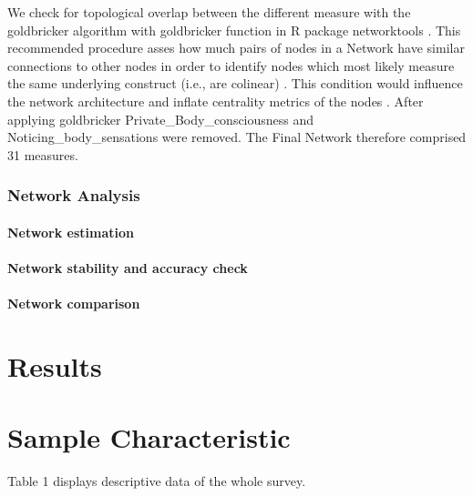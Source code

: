 \documentclass[preprint, 3p,
authoryear]{elsarticle} %
\begin{document}
We check for topological overlap between the different measure with the
goldbricker algorithm with goldbricker function in R package
networktools \citep{jones_networktools_2017}. This recommended procedure
\citep{tomei_network_2022, monteleone_systematic_2021} asses how much
pairs of nodes in a Network have similar connections to other nodes in
order to identify nodes which most likely measure the same underlying
construct (i.e., are colinear) \citep{jones_networktools_2017}. This
condition would influence the network architecture and inflate
centrality metrics of the nodes \citep{mcnally_network_2021}. After
applying goldbricker Private\_Body\_consciousness and
Noticing\_body\_sensations were removed. The Final Network therefore
comprised 31 measures.

\hypertarget{network-analysis}{%
\subsubsection{Network Analysis}\label{network-analysis}}

\hypertarget{network-estimation}{%
\paragraph{Network estimation}\label{network-estimation}}

\hypertarget{network-stability-and-accuracy-check}{%
\paragraph{Network stability and accuracy
check}\label{network-stability-and-accuracy-check}}

\hypertarget{network-comparison}{%
\paragraph{Network comparison}\label{network-comparison}}

\hypertarget{results}{%
\section{Results}\label{results}}

\hypertarget{sample-characteristic}{%
\section{Sample Characteristic}\label{sample-characteristic}}

Table 1 displays descriptive data of the whole survey.
\end{document}
